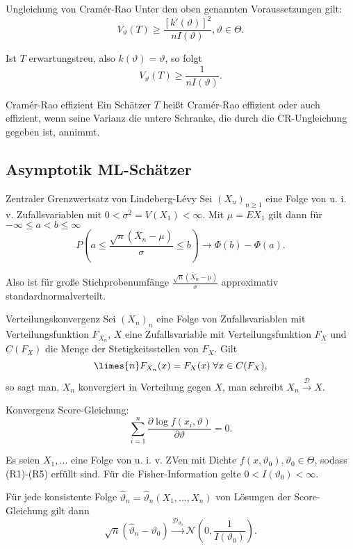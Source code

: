 \begin{karte}{Ungleichung von Cramér-Rao}
    Unter den oben genannten Voraussetzungen gilt: 
    \[ V_\vartheta(T) \geq \frac{[k'(\vartheta)]^2}{n I(\vartheta)}, \vartheta \in \Theta. \]

    Ist \(T\) erwartungstreu, also \(k(\vartheta) = \vartheta\), so folgt \[ V_\vartheta(T) \geq \frac{1}{n I(\vartheta)}. \]
\end{karte}

\begin{karte}{Cramér-Rao effizient}
    Ein Schätzer \(T\) heißt Cramér-Rao effizient oder auch effizient, wenn seine Varianz die untere Schranke, 
    die durch die CR-Ungleichung gegeben ist, annimmt.
\end{karte}

\subsection{Asymptotik ML-Schätzer}

\begin{karte}{Zentraler Grenzwertsatz von Lindeberg-Lévy}
    Sei \((X_n)_{n\geq 1}\) eine Folge von u. i. v. Zufallsvariablen mit \(0 < \sigma^2 = V(X_1) < \infty\).
    Mit \(\mu = E X_1\) gilt dann für \(-\infty \leq a < b \leq \infty\)
    \[ P\left( a \leq \frac{\sqrt{n} (\bar{X}_n - \mu)}{\sigma} \leq b \right) \rightarrow \Phi(b) - \Phi(a). \]

    Also ist für große Stichprobenumfänge \( \frac{\sqrt{n} (\bar{X}_n - \mu)}{\sigma} \) approximativ standardnormalverteilt.
\end{karte}

\begin{karte}{Verteilungskonvergenz}
    Sei \((X_n)_n\) eine Folge von Zufallsvariablen mit Verteilungsfunktion \(F_{X_n}\), \(X\) eine Zufallsvariable mit Verteilungsfunktion \(F_X\)
    und \(C(F_X)\) die Menge der Stetigkeitsstellen von \(F_X\).
    Gilt 
    \[ \limes{n} F_{X_n}(x) = F_X(x) \;\forall x \in C(F_X), \]
    so sagt man, \(X_n\) konvergiert in Verteilung gegen \(X\), man schreibt \(X_n \overset{\mathcal{D}}{\rightarrow} X\).
\end{karte}

\begin{karte}{Konvergenz}
Score-Gleichung: 
\[ \sum_{i=1}^n \frac{\partial \log f(x_i, \vartheta)}{\partial \vartheta} = 0. \]

Es seien \(X_1, \ldots\) eine Folge von u. i. v. ZVen mit Dichte \(f(x, \vartheta_0), \vartheta_0 \in \Theta\), sodass 
(R1)-(R5) erfüllt sind. Für die Fisher-Information gelte \(0 < I(\vartheta_0) < \infty\).

Für jede konsistente Folge \(\hat{\vartheta}_n = \hat{\vartheta}_n(X_1, \ldots, X_n)\) von Lösungen der Score-Gleichung gilt dann 
\[ \sqrt{n}(\hat{\vartheta}_n - \vartheta_0) \overset{\mathcal{D}_{\vartheta_0}}{\rightarrow} \mathcal{N}(0, \frac{1}{I(\vartheta_0)}). \]
\end{karte}

